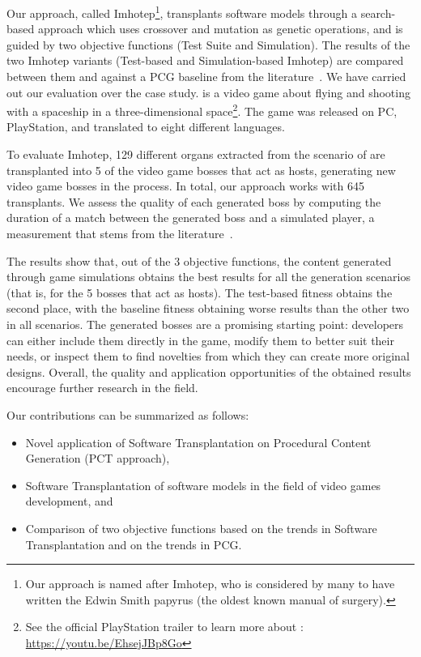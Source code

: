 Our approach, called Imhotep\footnote{Our approach is named after Imhotep, who is considered by many to have written the Edwin Smith papyrus (the oldest known manual of surgery).}, transplants software models through a search-based approach which uses crossover and mutation as genetic operations, and is guided by two objective functions (Test Suite and Simulation). The results of the two Imhotep variants (Test-based and Simulation-based Imhotep) are compared between them and against a PCG baseline from the literature~\cite{gallotta2022evolving}. We have carried out our evaluation over the \CaseStudy{} case study. \CaseStudy{} is a video game about flying and shooting with a spaceship in a three-dimensional space\footnote{See the official PlayStation trailer to learn more about \CaseStudy{}: \url{https://youtu.be/EhsejJBp8Go}}. The game was released on PC, PlayStation, and translated to eight different languages.

To evaluate Imhotep, 129 different organs extracted from the scenario of \CaseStudy{} are transplanted into 5 of the video game bosses that act as hosts, generating new video game bosses in the process. In total, our approach works with 645 transplants. We assess the quality of each generated boss by computing the duration of a match between the generated boss and a simulated player, a measurement that stems from the literature~\cite{browne2010evolutionary}. 

The results show that, out of the 3 objective functions, the content generated through game simulations obtains the best results for all the generation scenarios (that is, for the 5 bosses that act as hosts). The test-based fitness obtains the second place, with the baseline fitness obtaining worse results than the other two in all scenarios. The generated bosses are a promising starting point: developers can either include them directly in the game, modify them to better suit their needs, or inspect them to find novelties from which they can create more original designs. Overall, the quality and application opportunities of the obtained results encourage further research in the field.

Our contributions can be summarized as follows:
\begin{itemize}
    \item[\textbf{1}] Novel application of Software Transplantation on Procedural Content Generation (PCT approach),
    \item[\textbf{2}] Software Transplantation of software models in the field of video games development, and
    \item[\textbf{3}] Comparison of two objective functions based on the trends in Software Transplantation and on the trends in PCG.
\end{itemize}

